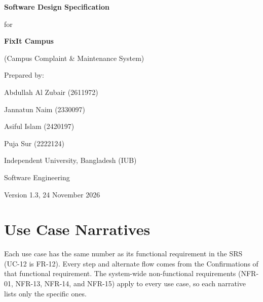 \documentclass[11pt,a4paper]{report}
\begin{document}
\begin{titlepage}
\centering
\vspace*{3cm}
{\LARGE\bfseries Software Design Specification\par}
\vspace{0.5cm}
{\Large for\par}
\vspace{0.5cm}
{\LARGE\bfseries FixIt Campus\par}
\vspace{0.3cm}
{\large (Campus Complaint \& Maintenance System)\par}
\vspace{2cm}
{\large Prepared by:\par}
\vspace{0.3cm}
Abdullah Al Zubair (2611972)\par
Jannatun Naim (2330097)\par
Asiful Islam (2420197)\par
Puja Sur (2222124)\par
\vspace{1.5cm}
Independent University, Bangladesh (IUB)\par
Software Engineering\par
\vspace{1cm}
Version 1.3, 24 November 2026
\end{titlepage}

\tableofcontents

\chapter{Use Case Narratives}
Each use case has the same number as its functional requirement in the SRS (UC-12 is FR-12). Every step and alternate flow comes from the Confirmations of that functional requirement. The system-wide non-functional requirements (NFR-01, NFR-13, NFR-14, and NFR-15) apply to every use case, so each narrative lists only the specific ones.
\end{document}
